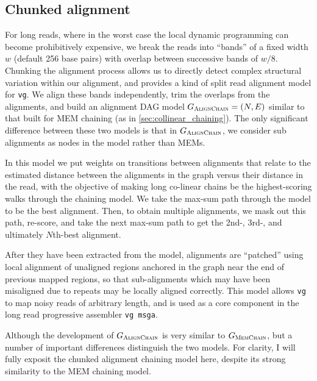 \subsection{Chunked alignment}
\label{sec:chunked_alignment}

For long reads, where in the worst case the local dynamic programming can become prohibitively expensive, we break the reads into ``bands'' of a fixed width $w$ (default 256 base pairs) with overlap between successive bands of $w/8$.
Chunking the alignment process allows us to directly detect complex structural variation within our alignment, and provides a kind of split read alignment model for {\tt vg}.
We align these bands independently, trim the overlaps from the alignments, and build an alignment DAG model $G_\textsc{AlignChain} = (N, E)$ similar to that built for MEM chaining (as in \ref{sec:collinear_chaining}).
The only significant difference between these two models is that in $G_\textsc{AlignChain}$, we consider sub alignments as nodes in the model rather than MEMs.

In this model we put weights on transitions between alignments that relate to the estimated distance between the alignments in the graph versus their distance in the read, with the objective of making long co-linear chains be the highest-scoring walks through the chaining model.
We take the max-sum path through the model to be the best alignment.
Then, to obtain multiple alignments, we mask out this path, re-score, and take the next max-sum path to get the 2nd-, 3rd-, and ultimately $N$th-best alignment.

After they have been extracted from the model, alignments are ``patched'' using local alignment of unaligned regions anchored in the graph near the end of previous mapped regions, so that sub-alignments which may have been misaligned due to repeats may be locally aligned correctly.
This model allows {\tt vg} to map noisy reads of arbitrary length, and is used as a core component in the long read progressive assembler {\tt vg msga}.

Although the development of $G_\textsc{AlignChain}$ is very similar to $G_\textsc{MemChain}$, but a number of important differences distinguish the two models.
For clarity, I will fully exposit the chunked alignment chaining model here, despite its strong similarity to the MEM chaining model.

